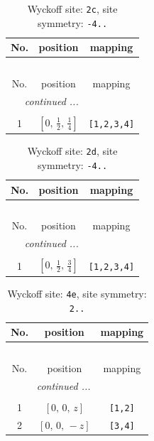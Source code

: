 \documentclass[fleqn,8pt]{jsarticle}
\begin{document}
\begin{longtable}{ccc}
\caption{Wyckoff site: {\tt 2c}, site symmetry: {\tt -4..}}
 \\
 \hline \hline
No. & position & mapping \\ \hline \endfirsthead

\multicolumn{2}{l}{\tablename\ \thetable{}} \\
 \hline \hline
No. & position & mapping \\ \hline \endhead

 \hline \hline
\multicolumn{2}{r}{\footnotesize\it continued ...} \\ \endfoot

 \hline \hline
\multicolumn{2}{r}{} \\ \endlastfoot

1 & $\left[ 0,\, \frac{1}{2},\, \frac{1}{4} \right]$ & {\tt [1,2,3,4]} \\
\end{longtable}
\renewcommand{\arraystretch}{1.2}
\begin{longtable}{ccc}
\caption{Wyckoff site: {\tt 2d}, site symmetry: {\tt -4..}}
 \\
 \hline \hline
No. & position & mapping \\ \hline \endfirsthead

\multicolumn{2}{l}{\tablename\ \thetable{}} \\
 \hline \hline
No. & position & mapping \\ \hline \endhead

 \hline \hline
\multicolumn{2}{r}{\footnotesize\it continued ...} \\ \endfoot

 \hline \hline
\multicolumn{2}{r}{} \\ \endlastfoot

1 & $\left[ 0,\, \frac{1}{2},\, \frac{3}{4} \right]$ & {\tt [1,2,3,4]} \\
\end{longtable}
\renewcommand{\arraystretch}{1.2}
\begin{longtable}{ccc}
\caption{Wyckoff site: {\tt 4e}, site symmetry: {\tt 2..}}
 \\
 \hline \hline
No. & position & mapping \\ \hline \endfirsthead

\multicolumn{2}{l}{\tablename\ \thetable{}} \\
 \hline \hline
No. & position & mapping \\ \hline \endhead

 \hline \hline
\multicolumn{2}{r}{\footnotesize\it continued ...} \\ \endfoot

 \hline \hline
\multicolumn{2}{r}{} \\ \endlastfoot

1 & $\left[ 0,\, 0,\, z \right]$ & {\tt [1,2]} \\ \hline
2 & $\left[ 0,\, 0,\, - z \right]$ & {\tt [3,4]} \\
\end{longtable}
\end{document}
